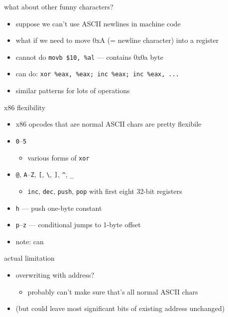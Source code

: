 \begin{frame}{what about other funny characters?}
    \begin{itemize}
    \item suppose we can't use ASCII newlines in machine code
    \item what if we need to move 0xA (= newline character) into a register
    \vspace{.5cm}
    \item cannot do \texttt{movb \$10, \%al} --- contains 0x0a byte
    \item can do: \texttt{xor \%eax, \%eax; inc \%eax; inc \%eax, ...}
    \vspace{.5cm}
    \item similar patterns for lots of operations
    \end{itemize}
\end{frame}

\begin{frame}{x86 flexibility}
    \begin{itemize}
    \item x86 opcodes that are normal ASCII chars are pretty flexibile
    \item {\tt 0}--{\tt 5}
        \begin{itemize}
        \item various forms of {\tt xor}
        \end{itemize}
    \item {\tt @}, {\tt A}--{\tt Z}, {\tt [}, {\tt \textbackslash}, {\tt ]}, {\tt \textasciicircum}, {\tt \_}
        \begin{itemize}
        \item {\tt inc}, {\tt dec}, {\tt push}, {\tt pop} with first eight 32-bit registers
        \end{itemize}
    \item {\tt h} --- push one-byte constant
    \item {\tt p}--{\tt z} --- conditional jumps to 1-byte offset
    \vspace{.5cm}
    \item<2> note: can 
    \end{itemize}
\end{frame}

\begin{frame}{actual limitation}
    \begin{itemize}
    \item overwriting with address? 
        \begin{itemize}
        \item probably can't make sure that's all normal ASCII chars
        \end{itemize}
    \item (but could leave most significant bits of existing address unchanged)
    \end{itemize}
\end{frame}



